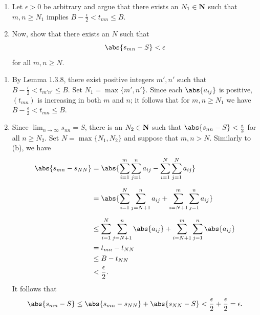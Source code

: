 \documentclass{lew98_solutions}
\begin{document}
\begin{exercise}
\label{ex:2.8.4}
    \begin{enumerate}
        \item Let \( \epsilon > 0 \) be arbitrary and argue that there exists an \( N_1 \in \mathbf{N} \) such that \( m, n \geq N_1 \) implies \( B - \tfrac{\epsilon}{2} < t_{mn} \leq B \).

        \item Now, show that there exists an \( N \) such that
        \[
            \abs{s_{mn} - S} < \epsilon
        \]
        for all \( m, n \geq N \).
    \end{enumerate}
\end{exercise}

\begin{solution}
    \begin{enumerate}
        \item By Lemma 1.3.8, there exist positive integers \( m', n' \) such that \( B - \tfrac{\epsilon}{2} < t_{m' n'} \leq B \). Set \( N_1 = \max \{ m', n' \} \). Since each \( \abs{a_{ij}} \) is positive, \( (t_{mn}) \) is increasing in both \( m \) and \( n \); it follows that for \( m, n \geq N_1 \) we have \( B - \tfrac{\epsilon}{2} < t_{mn} \leq B \).

        \item Since \( \lim_{n \to \infty} s_{nn} = S \), there is an \( N_2 \in \mathbf{N} \) such that \( \abs{s_{nn} - S} < \frac{\epsilon}{2} \) for all \( n \geq N_2 \). Set \( N = \max \{ N_1, N_2 \} \) and suppose that \( m, n > N \). Similarly to  (b), we have
        \begin{align*}
            \abs{s_{mn} - s_{NN}} &= \abs{\sum_{i=1}^m \sum_{j=1}^n a_{ij} - \sum_{i=1}^N \sum_{j=1}^N a_{ij}} \\[2mm]
            &= \abs{\sum_{i=1}^N \sum_{j=N+1}^n a_{ij} + \sum_{i=N+1}^m \sum_{j=1}^n a_{ij}} \\[2mm]
            &\leq \sum_{i=1}^N \sum_{j=N+1}^n \abs{a_{ij}} + \sum_{i=N+1}^m \sum_{j=1}^n \abs{a_{ij}} \\
            &= t_{mn} - t_{NN} \\
            &\leq B - t_{NN} \\
            &< \frac{\epsilon}{2}.
        \end{align*}
        It follows that
        \[
            \abs{s_{mn} - S} \leq \abs{s_{mn} - s_{NN}} + \abs{s_{NN} - S} < \frac{\epsilon}{2} + \frac{\epsilon}{2} = \epsilon.
        \]
    \end{enumerate}
\end{solution}
\end{document}
